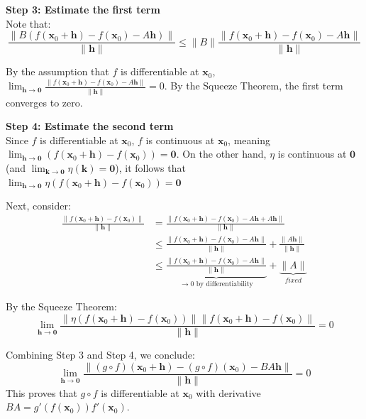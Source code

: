 \begin{pfbox}
\vspace{0.8em}
\noindent \textbf{Step 3: Estimate the first term} \\
Note that:
$$\frac{\|B(f(\mathbf{x}_0+\mathbf{h}) - f(\mathbf{x}_0) - A\mathbf{h})\|}{\|\mathbf{h}\|} \le \|B\| \frac{\|f(\mathbf{x}_0+\mathbf{h}) - f(\mathbf{x}_0) - A\mathbf{h}\|}{\|\mathbf{h}\|}$$ 

By the assumption that $f$ is differentiable at $\mathbf{x}_0$, $\lim_{\mathbf{h} \to \mathbf{0}} \frac{\|f(\mathbf{x}_0+\mathbf{h}) - f(\mathbf{x}_0) - A\mathbf{h}\|}{\|\mathbf{h}\|} = 0$. By the Squeeze Theorem, the first term converges to zero.

\vspace{0.8em}
\noindent \textbf{Step 4: Estimate the second term} \\
Since $f$ is differentiable at $\mathbf{x}_0$, $f$ is continuous at $\mathbf{x}_0$, meaning $\lim_{\mathbf{h} \to \mathbf{0}} (f(\mathbf{x}_0+\mathbf{h}) - f(\mathbf{x}_0)) = \mathbf{0}$.
On the other hand, $\eta$ is continuous at $\mathbf{0}$ (and $\lim_{\mathbf{k} \to \mathbf{0}} \eta(\mathbf{k}) = \mathbf{0}$), it follows that $\lim_{\mathbf{h} \to \mathbf{0}} \eta(f(\mathbf{x}_0+\mathbf{h}) - f(\mathbf{x}_0)) = \mathbf{0}$

Next, consider:
\begin{align*}
\frac{\|f(\mathbf{x}_0+\mathbf{h}) - f(\mathbf{x}_0)\|}{\|\mathbf{h}\|} &= \frac{\|f(\mathbf{x}_0+\mathbf{h}) - f(\mathbf{x}_0) - A\mathbf{h} + A\mathbf{h}\|}{\|\mathbf{h}\|} \\
&\le \frac{\|f(\mathbf{x}_0+\mathbf{h}) - f(\mathbf{x}_0) - A\mathbf{h}\|}{\|\mathbf{h}\|} + \frac{\|A\mathbf{h}\|}{\|\mathbf{h}\|} \\
&\le \underbrace{\frac{\|f(\mathbf{x}_0+\mathbf{h}) - f(\mathbf{x}_0) - A\mathbf{h}\|}{\|\mathbf{h}\|}}_{\to 0\text{ by differentiability}} + \underbrace{\|A\|}_{fixed}
\end{align*} 

By the Squeeze Theorem:
$$\lim_{\mathbf{h} \to \mathbf{0}} \frac{\|\eta(f(\mathbf{x}_0+\mathbf{h}) - f(\mathbf{x}_0))\| \|f(\mathbf{x}_0+\mathbf{h}) - f(\mathbf{x}_0)\|}{\|\mathbf{h}\|} = 0$$

Combining Step 3 and Step 4, we conclude:
$$\lim_{\mathbf{h} \to \mathbf{0}} \frac{\|(g \circ f)(\mathbf{x}_0+\mathbf{h}) - (g \circ f)(\mathbf{x}_0) - BA\mathbf{h}\|}{\|\mathbf{h}\|} = 0$$ 
This proves that $g \circ f$ is differentiable at $\mathbf{x}_0$ with derivative $BA = g'(f(\mathbf{x}_0)) f'(\mathbf{x}_0)$.

\end{pfbox}

